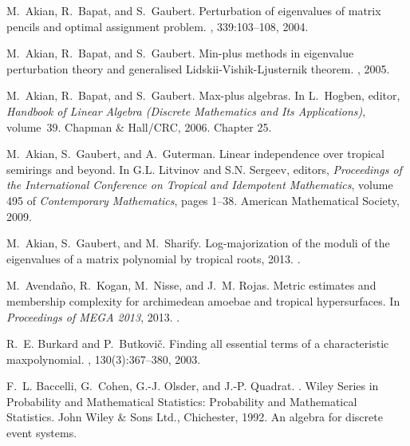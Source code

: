 \documentclass[a4paper]{amsart}
\theoremstyle{definition}
\theoremstyle{plain}
\theoremstyle{remark}
\begin{document}
\begin{thebibliography}{AKNR13}

M.~Akian, R.~Bapat, and S.~Gaubert.
\newblock Perturbation of eigenvalues of matrix pencils and optimal assignment
  problem.
, 339:103--108, 2004.

M.~Akian, R.~Bapat, and S.~Gaubert.
\newblock Min-plus methods in eigenvalue perturbation theory and generalised
  {L}idskii-{V}ishik-{L}justernik theorem.
, 2005.

M.~Akian, R.~Bapat, and S.~Gaubert.
\newblock Max-plus algebras.
\newblock In L.~Hogben, editor, {\em Handbook of Linear Algebra (Discrete
  Mathematics and Its Applications)}, volume~39. Chapman \& Hall/CRC, 2006.
\newblock Chapter 25.

M.~Akian, S.~Gaubert, and A.~Guterman.
\newblock Linear independence over tropical semirings and beyond.
\newblock In G.L. Litvinov and S.N. Sergeev, editors, {\em Proceedings of the
  International Conference on Tropical and Idempotent Mathematics}, volume 495
  of {\em Contemporary Mathematics}, pages 1--38. American Mathematical
  Society, 2009.

M.~Akian, S.~Gaubert, and M.~Sharify.
\newblock Log-majorization of the moduli of the eigenvalues of a matrix
  polynomial by tropical roots, 2013.
.

M.~Avenda{\~n}o, R.~Kogan, M.~Nisse, and J.~M. Rojas.
\newblock Metric estimates and membership complexity for archimedean amoebae
  and tropical hypersurfaces.
\newblock In {\em Proceedings of MEGA 2013}, 2013.
.

R.~E. Burkard and P.~Butkovi{\v{c}}.
\newblock Finding all essential terms of a characteristic maxpolynomial.
, 130(3):367--380, 2003.

F.~L. Baccelli, G.~Cohen, G.-J. Olsder, and J.-P. Quadrat.
.
\newblock Wiley Series in Probability and Mathematical Statistics: Probability
  and Mathematical Statistics. John Wiley \& Sons Ltd., Chichester, 1992.
\newblock An algebra for discrete event systems.


\end{thebibliography}
\end{document}
